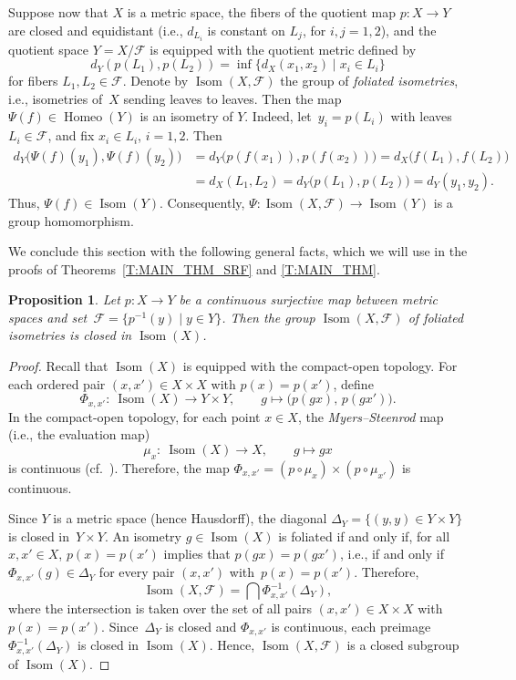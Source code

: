 \documentclass[10pt,a4paper]{amsart}
\numberwithin{equation}{section}
\newtheorem{prop}[thm]{Proposition}
\theoremstyle{definition}
\DeclareMathOperator{\Iso}{Isom}
\DeclareMathOperator{\Home}{\mathrm{Homeo}}
\newcommand{\fol}{\mathcal{F}}
\begin{document}
Suppose now that $X$ is a metric space, the fibers of the quotient map $p\colon X\to Y$ are closed and equidistant (i.e., $d_{L_i}$ is constant on $L_j$, for $i, j = 1, 2$), and the quotient space $Y=X/\fol$ is equipped with the quotient metric
defined by
\[
d_Y(p(L_1),p(L_2))=\inf\{d_X(x_1,x_2)\mid x_i\in L_i\}
\]
for fibers $L_1,L_2\in\fol$. Denote by $\Iso(X,\fol)$ the group of \emph{foliated isometries}, i.e., isometries of~$X$ sending leaves to leaves.
Then the map $\Psi(f)\in \Home(Y)$ is an isometry of $Y$. Indeed, let~${y_i=p(L_i)}$ with leaves $L_i\in \fol$, and fix $x_i\in L_i$, $i=1,2$.
Then
\begin{align*}
d_Y\bigl(\Psi(f)(y_1),\Psi(f)(y_2)\bigr)
 &= d_Y\bigl(p(f(x_1)),p(f(x_2))\bigr)= d_X\bigl(f(L_1),f(L_2)\bigr) \\
 &= d_X(L_1,L_2) = d_Y\bigl(p(L_1),p(L_2)\bigr)
 = d_Y(y_1,y_2).
\end{align*}
Thus, $\Psi(f)\in \Iso(Y)$.
Consequently, $\Psi\colon\Iso(X,\fol)\to \Iso(Y)$ is a group homomorphism.



We conclude this section with the following general facts, which we will use in the proofs of Theorems~\ref{T:MAIN_THM_SRF} and \ref{T:MAIN_THM}.




\begin{prop}
\label{P: Iso(Y) closed implies Iso(X,F) closed}
Let $p\colon X\to Y$ be a continuous surjective map between metric spaces
and set~${\fol = \big\{p^{-1}(y)\mid y\in Y\big\}}$. Then the group $\Iso (X,\fol)$ of foliated isometries is closed in $\Iso(X)$.
\end{prop}



\begin{proof}

Recall that $\Iso(X)$ is equipped with the compact-open topology.
For each ordered pair $(x,x')\in X\times X$ with $p(x)=p(x')$, define
\[
\Phi_{x,x'}\colon \ \Iso(X) \to Y\times Y,
\qquad
g \mapsto \bigl(p(gx),\,p(gx')\bigr).
\]
In the compact-open topology, for each point $x\in X$, the \emph{Myers--Steenrod} map (i.e., the evaluation map)
\[
\mu_x\colon \ \Iso(X)\to X, \qquad g\mapsto gx
\]
is continuous (cf.~\cite{GalazGarciaGuijarro2013,GuijarroSantos2018}). Therefore, the map
$
\Phi_{x,x'} = (p\circ \mu_x) \times (p\circ \mu_{x'})
$
is continuous.

Since $Y$ is a metric space (hence Hausdorff), the diagonal
$
\Delta_Y = \{(y,y) \in Y\times Y\}
$
is closed in~${Y\times Y}$.
An isometry $g\in \Iso(X)$ is foliated if and only if, for all $x,x' \in X$,
$p(x)=p(x')$ implies that $p(gx)=p(gx')$,
i.e., if and only if $\Phi_{x,x'}(g)\in \Delta_Y$ for every pair $(x,x')$ with~${p(x)=p(x')}$. Therefore,
\[
\Iso(X,\fol) = \bigcap\Phi_{x,x'}^{-1}(\Delta_Y),
\]
where the intersection is taken over the set of all pairs $(x,x')\in X\times X$ with $p(x)=p(x')$. Since~$\Delta_Y$ is closed and $\Phi_{x,x'}$ is continuous, each preimage $\Phi_{x,x'}^{-1}(\Delta_Y)$ is closed in $\Iso(X)$. Hence, $\Iso(X,\fol)$ is a closed subgroup of $\Iso(X)$.
\end{proof}
\end{document}
